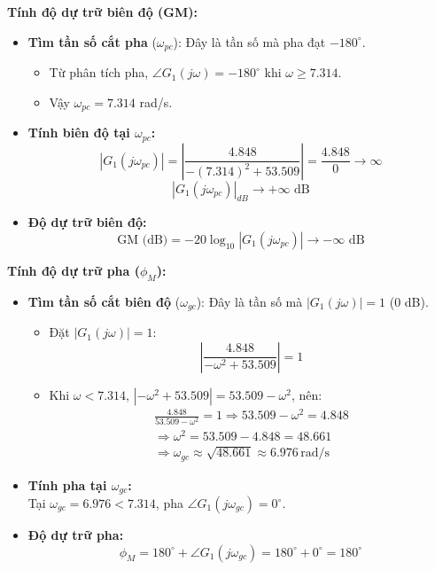     \textbf{Tính độ dự trữ biên độ (GM):}
    \begin{itemize}
        \item \textbf{Tìm tần số cắt pha} ($\omega_{pc}$): Đây là tần số mà pha đạt $-180^\circ$.
        \begin{itemize}
            \item Từ phân tích pha, $\angle G_1(j\omega) = -180^\circ$ khi $\omega \geq 7.314$.
            \item Vậy $\omega_{pc} = 7.314$ rad/s.
        \end{itemize}
        \item \textbf{Tính biên độ tại $\omega_{pc}$:}
            \[
            |G_1(j\omega_{pc})| = \left| \frac{4.848}{-(7.314)^2 + 53.509} \right| = \frac{4.848}{0} \to \infty
            \]
            \[
            |G_1(j\omega_{pc})|_{dB} \to +\infty \text{ dB}
            \]
            \item \textbf{Độ dự trữ biên độ:}
            \[
            \text{GM (dB)} = -20 \log_{10} |G_1(j\omega_{pc})| \to -\infty \text{ dB}
            \]
    \end{itemize}
    \textbf{Tính độ dự trữ pha ($\phi_M$):}           
        \begin{itemize}
            \item \textbf{Tìm tần số cắt biên độ} ($\omega_{gc}$): Đây là tần số mà $|G_1(j\omega)| = 1$ (0 dB).
            \begin{itemize}
                \item Đặt $|G_1(j\omega)| = 1$:
                \[
                \left| \frac{4.848}{-\omega^2 + 53.509} \right| = 1
                \]
                \item Khi $\omega < 7.314$, $|-\omega^2 + 53.509| = 53.509 - \omega^2$, nên:
                \begin{align*}
                    \frac{4.848}{53.509 - \omega^2} = 1 \Rightarrow 53.509 - \omega^2 = 4.848 \\
                    \Rightarrow \omega^2 = 53.509 - 4.848 = 48.661 \\
                    \Rightarrow \omega_{gc} \approx \sqrt{48.661} \approx 6.976 \, \text{rad/s}
                    \end{align*}
                \end{itemize}
                \item \textbf{Tính pha tại $\omega_{gc}$:} \\
                    Tại $\omega_{gc} = 6.976 < 7.314$, pha $\angle G_1(j\omega_{gc}) = 0^\circ$.
                \item \textbf{Độ dự trữ pha:}
                \[
                \phi_M = 180^\circ + \angle G_1(j\omega_{gc}) = 180^\circ + 0^\circ = 180^\circ
                \]
            \end{itemize}
        
